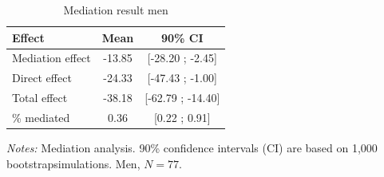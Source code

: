 \begin{table}[htbp]
\centering
\caption{Mediation result men}
\label{tab:mediation_attractiveness_men}
\begin{threeparttable}
\begin{tabular}{@{}lcc@{}}
\toprule
Effect & Mean & 90\% CI \\
\midrule
Mediation effect & -13.85 & [-28.20 ; -2.45] \\
Direct effect & -24.33 & [-47.43 ; -1.00] \\
Total effect & -38.18 & [-62.79 ; -14.40] \\
\% mediated & 0.36 & [0.22 ; 0.91] \\
\bottomrule
\end{tabular}
\begin{tablenotes}[flushleft]
\footnotesize
\item[] \textit{Notes:} Mediation analysis. 90\% confidence intervals (CI) are based on 1,000 bootstrapsimulations. Men, \(N=77\).
\end{tablenotes}
\end{threeparttable}
\end{table}
